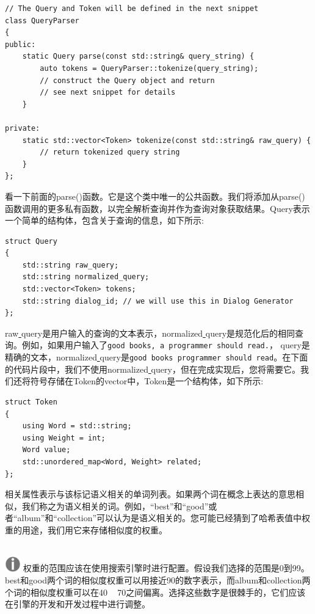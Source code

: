 \begin{lstlisting}[caption={}]
// The Query and Token will be defined in the next snippet
class QueryParser
{
public:
	static Query parse(const std::string& query_string) {
		auto tokens = QueryParser::tokenize(query_string);
		// construct the Query object and return
		// see next snippet for details
	}

private:
	static std::vector<Token> tokenize(const std::string& raw_query) {
		// return tokenized query string
	}
};
\end{lstlisting}

看一下前面的parse()函数。它是这个类中唯一的公共函数。我们将添加从parse()函数调用的更多私有函数，以完全解析查询并作为查询对象获取结果。Query表示一个简单的结构体，包含关于查询的信息，如下所示: \par

\begin{lstlisting}[caption={}]
struct Query
{
	std::string raw_query;
	std::string normalized_query;
	std::vector<Token> tokens;
	std::string dialog_id; // we will use this in Dialog Generator
};
\end{lstlisting}

raw\underline{ }query是用户输入的查询的文本表示，normalized\underline{ }query是规范化后的相同查询。例如，如果用户输入了\texttt{good books, a programmer should read.}， \underline{ }query是精确的文本，normalized\underline{ }query是\texttt{good books programmer should read}。在下面的代码片段中，我们不使用normalized\underline{ }query，但在完成实现后，您将需要它。我们还将符号存储在Token的vector中，Token是一个结构体，如下所示: \par

\begin{lstlisting}[caption={}]
struct Token
{
	using Word = std::string;
	using Weight = int;
	Word value;
	std::unordered_map<Word, Weight> related;
};
\end{lstlisting}

相关属性表示与该标记语义相关的单词列表。如果两个词在概念上表达的意思相似，我们称之为语义相关的词。例如，“best”和“good”或者“album”和“collection”可以认为是语义相关的。您可能已经猜到了哈希表值中权重的用途，我们用它来存储相似度的权重。\par

\hspace*{\fill} \\ %
\includegraphics[width=0.05\textwidth]{images/warn}
权重的范围应该在使用搜索引擎时进行配置。假设我们选择的范围是0到99。best和good两个词的相似度权重可以用接近90的数字表示，而album和collection两个词的相似度权重可以在40 ~ 70之间偏离。选择这些数字是很棘手的，它们应该在引擎的开发和开发过程中进行调整。 \par
\noindent\textbf{}\ \par

